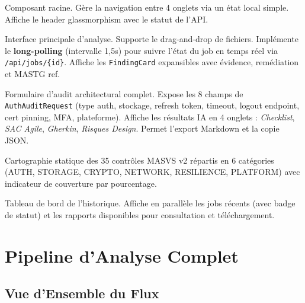 \documentclass[12pt,a4paper,french]{article}
\newcommand{\file}[1]{\textcolor{primary}{\texttt{#1}}}
\begin{document}
\begin{description}[leftmargin=2cm, style=nextline]
  \item[\file{App.tsx}]
    Composant racine. Gère la navigation entre 4 onglets via un état local simple.
    Affiche le header glassmorphism avec le statut de l'API.

  \item[\file{Scanner.tsx}]
    Interface principale d'analyse. Supporte le drag-and-drop de fichiers.
    Implémente le \textbf{long-polling} (intervalle 1,5s) pour suivre l'état du job
    en temps réel via \texttt{/api/jobs/\{id\}}.
    Affiche les \texttt{FindingCard} expansibles avec évidence, remédiation et MASTG ref.

  \item[\file{AuthAudit.tsx}]
    Formulaire d'audit architectural complet. Expose les 8 champs de \texttt{AuthAuditRequest}
    (type auth, stockage, refresh token, timeout, logout endpoint, cert pinning, MFA, plateforme).
    Affiche les résultats IA en 4 onglets : \textit{Checklist}, \textit{SAC Agile},
    \textit{Gherkin}, \textit{Risques Design}.
    Permet l'export Markdown et la copie JSON.

  \item[\file{MASVSMapping.tsx}]
    Cartographie statique des 35 contrôles MASVS v2 répartis en 6 catégories
    (AUTH, STORAGE, CRYPTO, NETWORK, RESILIENCE, PLATFORM) avec indicateur de couverture
    par pourcentage.

  \item[\file{ReportHistory.tsx}]
    Tableau de bord de l'historique. Affiche en parallèle les jobs récents (avec badge
    de statut) et les rapports disponibles pour consultation et téléchargement.
\end{description}

\section{Pipeline d'Analyse Complet}
\label{sec:pipeline}

\subsection{Vue d'Ensemble du Flux}
\end{document}
